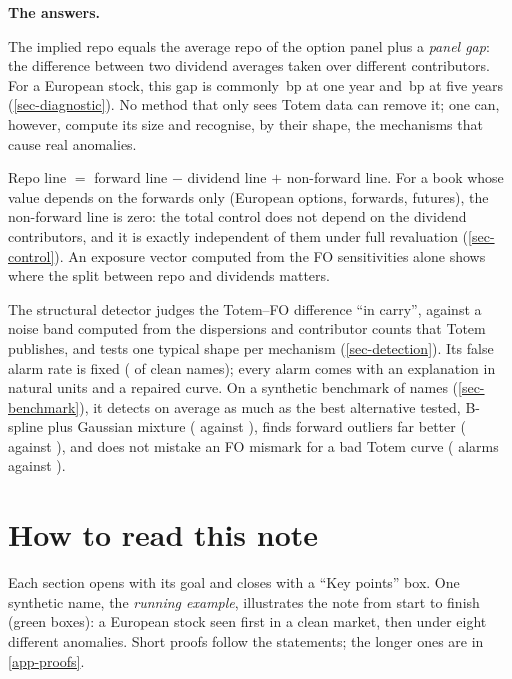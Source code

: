 \begin{bref}
\medskip
\textbf{The answers.}
\begin{description}[leftmargin=1.1cm,labelwidth=0.9cm,labelsep=0.2cm,itemsep=2pt]
\item[A1] The implied repo equals the average repo of the option panel plus a \emph{panel gap}: the difference
between two dividend averages taken over different contributors. For a European stock, this gap is commonly
\vGapOneY\,bp at one year and \vGapFiveY\,bp at five years (\cref{sec-diagnostic}). No method that only sees Totem
data can remove it; one can, however, compute its size and recognise, by their shape, the mechanisms that cause real
anomalies.
\item[A2] Repo line $=$ forward line $-$ dividend line $+$ non-forward line. For a book whose value depends on the
forwards only (European options, forwards, futures), the non-forward line is zero: the total control does not depend on
the dividend contributors, and it is exactly independent of them under full revaluation (\cref{sec-control}). An
exposure vector computed from the FO sensitivities alone shows where the split between repo and dividends matters.
\item[A3] The structural detector judges the Totem--FO difference ``in carry'', against a noise band computed from the
dispersions and contributor counts that Totem publishes, and tests one typical shape per mechanism
(\cref{sec-detection}). Its false alarm rate is fixed (\vFPR{} of clean names); every alarm comes with an explanation in
natural units and a repaired curve. On a synthetic benchmark of \vNTest{} names (\cref{sec-benchmark}), it detects on
average as much as the best alternative tested, B-spline plus Gaussian mixture (\vMeanStruct{} against
\vMeanGmmDiff{}), finds forward outliers far better (\vFwdStruct{} against \vFwdGmmDiff{}), and does not mistake an FO
mismark for a bad Totem curve (\vFoStruct{} alarms against \vFoGmmDiff{}).
\end{description}
\end{bref}

\newpage
\section*{How to read this note}
Each section opens with its goal and closes with a ``Key points'' box. One synthetic name, the \emph{running example},
illustrates the note from start to finish (green boxes): a European stock seen first in a clean market, then under eight
different anomalies. Short proofs follow the statements; the longer ones are in \cref{app-proofs}.

